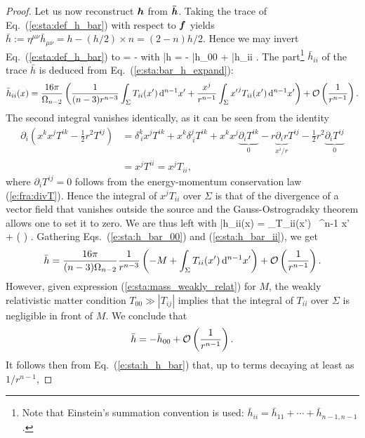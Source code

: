 \begin{proof}
Let us now reconstruct $\bm{h}$ from $\bm{\bar{h}}$. Taking the trace of Eq.~(\ref{e:sta:def_h_bar}) with respect to $\bm{f}$
yields $\bar{h} := \eta^{\mu\nu} \bar{h}_{\mu\nu} = h - (h/2) \times n = (2 - n) h / 2$.
Hence we may invert Eq.~(\ref{e:sta:def_h_bar}) to
\be \label{e:sta:h_h_bar}
     =  -  
    \quad\mbox{with}\quad
    \bar{h} = - \bar{h}_{00} + \bar{h}_{ii} .
\ee
The part\footnote{Note that Einstein's summation convention is used:
$\bar{h}_{ii} = \bar{h}_{11} + \cdots + \bar{h}_{n-1,n-1}$.}
 $\bar{h}_{ii}$ of the trace $\bar{h}$ is deduced from
Eq.~(\ref{e:sta:bar_h_expand}):
\[
    {\bar{h}}_{ii}(x)  = \frac{16\pi}{\Omega_{n-2}}
        \left( \frac{1}{(n-3)r^{n-3}} \int_\Sigma T_{ii}({x'}) \, \mathrm{d}^{n-1} {x'}
        + \frac{x^j}{r^{n-1}}  \int_\Sigma {x'}^j T_{ii}({x'}) \, \mathrm{d}^{n-1} {x'}
         \right)  + \mathcal{O}\left( \frac{1}{r^{n-1}} \right) .
\]
The second integral vanishes identically, as it can be seen from the identity
\begin{align}
    \partial_i \left( x^k x^j T^{ik}  - \frac{1}{2} r^2 T^{ij} \right) & =
    \delta^k_{\ i} x^j T^{ik} + x^k \delta^j_{\ i} T^{ik} +
    x^k x^j \underbrace{\partial_i T^{ik}}_{0}
    - r \underbrace{\partial_i r}_{x^i/r} T^{ij} - \frac{1}{2} r^2 \underbrace{\partial_i T^{ij}}_{0} \nonumber \\
    & = x^j T^{ii} = x^j T_{ii} , \nonumber
\end{align}
where $\partial_i T^{ij}=0$ follows from the energy-momentum conservation law (\ref{e:fra:divT}). Hence the integral of $x^j T_{ii}$ over $\Sigma$ is that of the divergence of a vector
field that vanishes outside the source and the Gauss-Ostrogradsky theorem allows one to set it to zero.
We are thus left with
\be \label{e:sta:h_bar_ii}
    {\bar{h}}_{ii}(x)  = 
         \int_\Sigma T_{ii}({x'}) \, \D^{n-1} {x'}
            + \bigO\left(  \right) .
\ee
Gathering Eqs.~(\ref{e:sta:h_bar_00}) and (\ref{e:sta:h_bar_ii}), we get
\[
    \bar{h} = \frac{16\pi}{(n-3)\Omega_{n-2}}
        \frac{1}{r^{n-3}} \left( - M + \int_\Sigma T_{ii}({x'}) \, \mathrm{d}^{n-1} {x'} \right)
            + \mathcal{O}\left( \frac{1}{r^{n-1}} \right) .
\]
However, given expression (\ref{e:sta:mass_weakly_relat}) for $M$, the weakly relativistic matter condition
$T_{00} \gg |T_{ij}|$ implies that the integral of $T_{ii}$ over $\Sigma$ is negligible in front of $M$. We conclude that
\[
    \bar{h} = - \bar{h}_{00} + \mathcal{O}\left( \frac{1}{r^{n-1}} \right) .
\]
It follows then from Eq.~(\ref{e:sta:h_h_bar}) that, up to terms decaying at least as $1/r^{n-1}$,

\end{proof}
